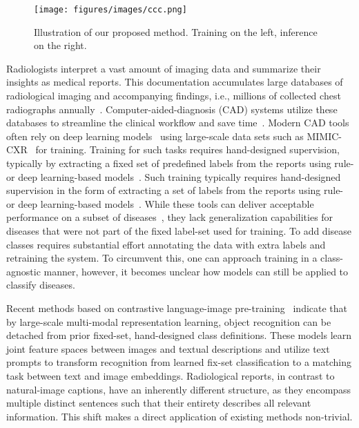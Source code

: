 \documentclass[runningheads]{llncs}
\begin{document}
\begin{figure*}[t]
    \centering
         \texttt{[image: figures/images/ccc.png]}
    \caption{Illustration of our proposed method. Training on the left, inference on the right.}
    \label{fig:method}
\end{figure*} 
Radiologists interpret a vast amount of imaging data and summarize their insights as medical reports. This documentation accumulates large databases of radiological imaging and accompanying findings, i.e.,  millions of collected chest radiographs annually~\cite{nhs}. Computer-aided-diagnosis (CAD) systems utilize these databases to streamline the clinical workflow and save time~\cite{qin2018computer,kim2019deep,jaiswal2019identifying}.
Modern CAD tools often rely on deep learning models~\cite{qin2018computer} using large-scale data sets such as MIMIC-CXR~\cite{wang2017chestx,johnson2019mimic,irvin2019chexpert,bustos2020padchest} for training.
Training for such tasks requires hand-designed supervision, typically by extracting a fixed set of predefined labels from the reports using rule- or deep learning-based models~\cite{wang2017chestx,irvin2019chexpert,smit2020chexbert}.
Such training typically requires hand-designed supervision in the form of extracting a set of labels from the reports using rule- or deep learning-based models~\cite{wang2017chestx,irvin2019chexpert,smit2020chexbert}.
While these tools can deliver acceptable performance on a subset of diseases~\cite{wu2020comparison}, they lack generalization capabilities for diseases that were not part of the fixed label-set used for training.
To add disease classes requires substantial effort annotating the data with extra labels and retraining the system. To circumvent this, one can approach training in a class-agnostic manner, however, it becomes unclear how models can still be applied to classify diseases.

Recent methods based on contrastive language-image pre-training~\cite{radford2021learning,jia2021scaling,pham2021combined,zhang2020contrastive,wang2021self} indicate that by large-scale multi-modal representation learning, object recognition can be detached from prior fixed-set, hand-designed class definitions. These models learn joint feature spaces between images and textual descriptions and utilize text prompts to transform recognition from learned fix-set classification to a matching task between text and image embeddings.
Radiological reports, in contrast to natural-image captions, have an inherently different structure, as they encompass multiple distinct sentences such that their entirety describes all relevant information. This shift makes a direct application of existing methods non-trivial. 
\end{document}
